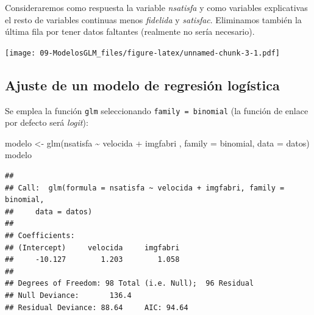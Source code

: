 \documentclass[
]{book}
\newenvironment{Shaded}{\begin{snugshade}}{\end{snugshade}}
\newcommand{\AttributeTok}[1]{\textcolor[rgb]{0.77,0.63,0.00}{#1}}
\newcommand{\DecValTok}[1]{\textcolor[rgb]{0.00,0.00,0.81}{#1}}
\newcommand{\FunctionTok}[1]{\textcolor[rgb]{0.00,0.00,0.00}{#1}}
\newcommand{\NormalTok}[1]{#1}
\newcommand{\OtherTok}[1]{\textcolor[rgb]{0.56,0.35,0.01}{#1}}
\newcommand{\SpecialCharTok}[1]{\textcolor[rgb]{0.00,0.00,0.00}{#1}}
\theoremstyle{break}
\begin{document}
Consideraremos como respuesta la variable \emph{nsatisfa} y como variables explicativas
el resto de variables continuas menos \emph{fidelida} y \emph{satisfac}.
Eliminamos también la última fila por tener datos faltantes (realmente no sería necesario).

\begin{Shaded}
\end{Shaded}

\texttt{[image: 09-ModelosGLM\_files/figure-latex/unnamed-chunk-3-1.pdf]}

\hypertarget{ajuste-de-un-modelo-de-regresiuxf3n-loguxedstica}{%
\subsection{Ajuste de un modelo de regresión logística}\label{ajuste-de-un-modelo-de-regresiuxf3n-loguxedstica}}

Se emplea la función \texttt{glm} seleccionando \texttt{family\ =\ binomial} (la función de enlace por defecto será \emph{logit}):

\begin{Shaded}
\begin{Highlighting}[]
\NormalTok{modelo }\OtherTok{\textless{}{-}} \FunctionTok{glm}\NormalTok{(nsatisfa }\SpecialCharTok{\textasciitilde{}}\NormalTok{ velocida }\SpecialCharTok{+}\NormalTok{ imgfabri , }\AttributeTok{family =}\NormalTok{ binomial, }\AttributeTok{data =}\NormalTok{ datos)}
\NormalTok{modelo}
\end{Highlighting}
\end{Shaded}

\begin{verbatim}
## 
## Call:  glm(formula = nsatisfa ~ velocida + imgfabri, family = binomial, 
##     data = datos)
## 
## Coefficients:
## (Intercept)     velocida     imgfabri  
##     -10.127        1.203        1.058  
## 
## Degrees of Freedom: 98 Total (i.e. Null);  96 Residual
## Null Deviance:       136.4 
## Residual Deviance: 88.64     AIC: 94.64
\end{verbatim}
\end{document}
